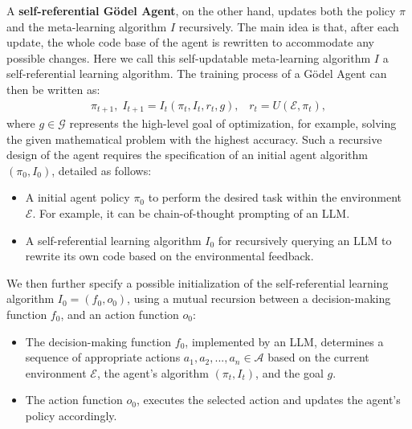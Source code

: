 \documentclass[11pt]{article}
\newcommand{\framework}{Gödel Agent\xspace}
\begin{document}
A \textbf{self-referential \framework}, on the other hand, updates both the policy $\pi$ and the meta-learning algorithm $I$ recursively. The main idea is that, after each update, the whole code base of the agent is rewritten to accommodate any possible changes. Here we call this self-updatable meta-learning algorithm $I$ a self-referential learning algorithm. The training process of a \framework can then be written as:
\begin{align*}
    \pi_{t+1}, \; I_{t+1} = I_t(\pi_t, I_t, r_t, g),\;\;\; r_t = U(\mathcal{E}, \pi_t),
\end{align*}
where $g \in \mathcal{G}$ represents the high-level goal of optimization, for example, solving the given mathematical problem with the highest accuracy. Such a recursive design of the agent requires the specification of an initial agent algorithm $(\pi_0, I_0)$, detailed as follows:
\begin{itemize}[leftmargin=*,itemsep=1pt]
    \item A initial agent policy $\pi_0$ to perform the desired task within the environment $\mathcal{E}$. For example, it can be chain-of-thought prompting of an LLM.
    \item A self-referential learning algorithm $I_0$ for recursively querying an LLM to rewrite its own code based on the environmental feedback.
\end{itemize}
We then further specify a possible initialization of the self-referential learning algorithm $I_0 = (f_0, o_0)$, using a mutual recursion between a decision-making function $f_0$, and an action function $o_0$:
\begin{itemize}[leftmargin=*,itemsep=1pt]
    \item The decision-making function $f_0$, implemented by an LLM, determines a sequence of appropriate actions $a_1, a_2, ..., a_n \in \mathcal{A}$ based on the current environment $\mathcal{E}$, the agent's algorithm $(\pi_t, I_t)$, and the goal $g$.
    \item The action function $o_0$, executes the selected action and updates the agent's policy accordingly. 
\end{itemize}
\end{document}
